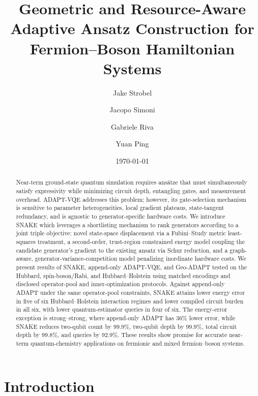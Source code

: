 \documentclass[
  reprint,
  amsmath,
  amssymb,
  aps,
  pra,
  nofootinbib,
  superscriptaddress,
  floatfix
]{revtex4-2}
\begin{document}
\title{Geometric and Resource-Aware Adaptive Ansatz Construction for Fermion--Boson Hamiltonian Systems}

\author{Jake Strobel}
\author{Jacopo Simoni}
\author{Gabriele Riva}
\author{Yuan Ping}

\date{\today}

\begin{abstract}
Near-term ground-state quantum simulation requires ansätze that must simultaneously satisfy expressivity while minimizing circuit depth, entangling gates, and measurement overhead. ADAPT-VQE addresses this problem; however, its gate-selection mechanism is sensitive to parameter heterogeneities, local gradient plateaus, state-tangent redundancy, and is agnostic to generator-specific hardware costs. We introduce SNAKE which leverages a shortlisting mechanism to rank generators according to a joint triple objective: novel state-space displacement via a Fubini--Study metric least-squares treatment, a second-order, trust-region constrained energy model coupling the candidate generator's gradient to the existing ansatz via Schur reduction, and a graph-aware, generator-variance-competition model penalizing inordinate hardware costs. We present results of SNAKE, append-only ADAPT-VQE, and Geo-ADAPT tested on the Hubbard, spin-boson/Rabi, and Hubbard--Holstein using matched encodings and disclosed operator-pool and inner-optimization protocols. Against append-only ADAPT under the same operator-pool constraints, SNAKE attains lower energy error in five of six Hubbard--Holstein interaction regimes and lower compiled circuit burden in all six, with lower quantum-estimator queries in four of six. The energy-error exception is strong--strong, where append-only ADAPT has \(36\%\) lower error, while SNAKE reduces two-qubit count by \(99.9\%\), two-qubit depth by \(99.9\%\), total circuit depth by \(99.8\%\), and queries by \(92.9\%\). These results show promise for accurate near-term quantum-chemistry applications on fermionic and mixed fermion--boson systems.


\end{abstract}

\maketitle







\section{Introduction}
\end{document}
